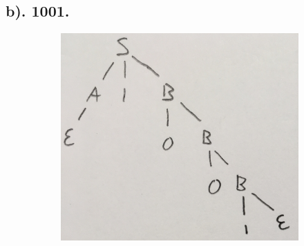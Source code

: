 \documentclass[20pt]{article} %
\begin{document}
\subsection{b). 1001.}
\begin{figure}[!htbp]
  	\centering
   	\begin{subfigure}[p]{0.5\linewidth}
    	\includegraphics[width=\linewidth]{./figures/h6-2.jpg}
   	\end{subfigure}
\end{figure} 
\newpage
\end{document}

